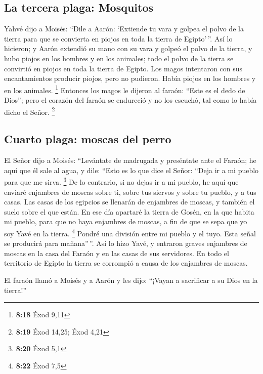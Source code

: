 \begin{paracol}{2}
\hypertarget{la-tercera-plaga-mosquitos}{%
\subsection{La tercera plaga:
Mosquitos}\label{la-tercera-plaga-mosquitos}}

 Yahvé dijo a Moisés: ``Dile a Aarón: `Extiende tu vara y
golpea el polvo de la tierra para que se convierta en piojos en toda la
tierra de Egipto'\,''.  Así lo hicieron; y Aarón extendió
su mano con su vara y golpeó el polvo de la tierra, y hubo piojos en los
hombres y en los animales; todo el polvo de la tierra se convirtió en
piojos en toda la tierra de Egipto.  Los magos intentaron
con sus encantamientos producir piojos, pero no pudieron. Había piojos
en los hombres y en los animales. \footnote{\textbf{8:18} Éxod 9,11}
 Entonces los magos le dijeron al faraón: ``Este es el
dedo de Dios''; pero el corazón del faraón se endureció y no los
escuchó, tal como lo había dicho el Señor. \footnote{\textbf{8:19} Éxod
  14,25; Éxod 4,21}

\hypertarget{cuarto-plaga-moscas-del-perro}{%
\subsection{Cuarto plaga: moscas del
perro}\label{cuarto-plaga-moscas-del-perro}}

 El Señor dijo a Moisés: ``Levántate de madrugada y
preséntate ante el Faraón; he aquí que él sale al agua, y dile: ``Esto
es lo que dice el Señor: ``Deja ir a mi pueblo para que me sirva.
\footnote{\textbf{8:20} Éxod 5,1}  De lo contrario, si no
dejas ir a mi pueblo, he aquí que enviaré enjambres de moscas sobre ti,
sobre tus siervos y sobre tu pueblo, y a tus casas. Las casas de los
egipcios se llenarán de enjambres de moscas, y también el suelo sobre el
que están.  En ese día apartaré la tierra de Gosén, en la
que habita mi pueblo, para que no haya enjambres de moscas, a fin de que
se sepa que yo soy Yavé en la tierra. \footnote{\textbf{8:22} Éxod 7,5}
 Pondré una división entre mi pueblo y el tuyo. Esta
señal se producirá para mañana''\,''.  Así lo hizo Yavé,
y entraron graves enjambres de moscas en la casa del Faraón y en las
casas de sus servidores. En todo el territorio de Egipto la tierra se
corrompió a causa de los enjambres de moscas.

 El faraón llamó a Moisés y a Aarón y les dijo: ``¡Vayan
a sacrificar a su Dios en la tierra!''


\end{paracol}
